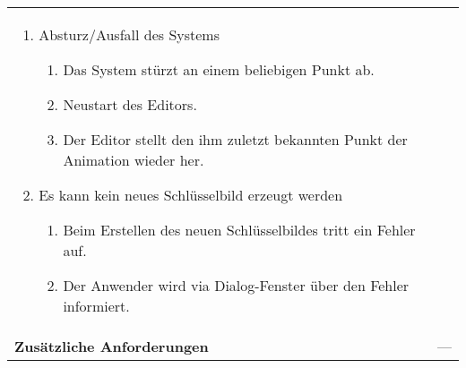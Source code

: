 \begin{longtabu}{p{0.5\textwidth}p{0.5\textwidth}}
\begin{enumerate}[label= (\alph*)]
            \item{Absturz/Ausfall des Systems
                \begin{enumerate}[label= (\roman*)]
                        \item{Das System stürzt an einem beliebigen Punkt
                                ab.}
                        \item{Neustart des Editors.}
                        \item{Der Editor stellt den ihm zuletzt bekannten
                                Punkt der Animation wieder her.}
                \end{enumerate}
            }
            \item{Es kann kein neues Schlüsselbild erzeugt werden
                \begin{enumerate}[label= (\roman*)]
                    \item{Beim Erstellen des neuen Schlüsselbildes tritt ein Fehler auf.}
                    \item{Der Anwender wird via Dialog-Fenster über den Fehler
                            informiert.}
                \end{enumerate}
            }
        \end{enumerate} \\
    \cmidrule(r){1-1}\cmidrule(lr){2-2}
        \textbf{Zusätzliche Anforderungen} &
        --- \\
    \bottomrule
\end{longtabu}
